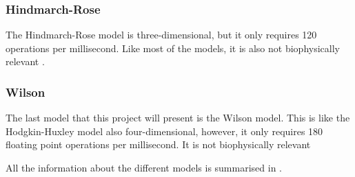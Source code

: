 \documentclass[class={myRUCProject}, crop=false]{standalone}
\begin{document}

\subsubsection*{Hindmarch-Rose}
The Hindmarch-Rose model is three-dimensional, but it only requires 120 operations per millisecond. Like most of the models, it is also not biophysically relevant \cite{Izhikevich2004}.


\subsubsection*{Wilson}
The last model that this project will present is the Wilson model. This is like the Hodgkin-Huxley model also four-dimensional, however, it only requires 180 floating point operations per millisecond. It is not biophysically relevant \cite{Izhikevich2004}


\noindent All the information about the different models is summarised in . 
\end{document}

